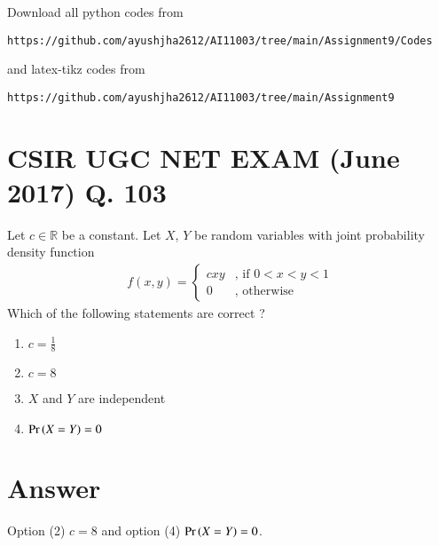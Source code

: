 \documentclass[journal,12pt,twocolumn]{IEEEtran}
\begin{document}
\author{Name : Ayush Jha \\ Roll Number: CS20BTECH11006}
\maketitle
\newpage
\bigskip
\renewcommand{\thefigure}{\theenumi}
\renewcommand{\thetable}{\theenumi}
Download all python codes from 
\begin{lstlisting}
https://github.com/ayushjha2612/AI11003/tree/main/Assignment9/Codes
\end{lstlisting}
%
and latex-tikz codes from 
%
\begin{lstlisting}
https://github.com/ayushjha2612/AI11003/tree/main/Assignment9
\end{lstlisting}
\section*{CSIR UGC NET EXAM (June 2017) Q. 103}
Let $ c \in \mathbb{R} $ be a constant. Let $ X$, $Y$ be random variables with joint probability density function 
\begin{align*}
f(x,y)  = 
\begin{cases}
cxy & \text{, if } 0<x<y<1
\\
0 & \text{, otherwise }
\end{cases}
\end{align*}
Which of the following statements are correct ?
\begin{enumerate}
    \item $c = \frac{1}{8}$
    \item $ c= 8$
    \item $X $ and $ Y$ are independent
    \item $\Pr\left(X= Y\right) = 0 $
\end{enumerate}
\section*{Answer}
Option (2) $ c= 8$ and option (4) $\Pr\left(X= Y\right) = 0 $.
\end{document}
